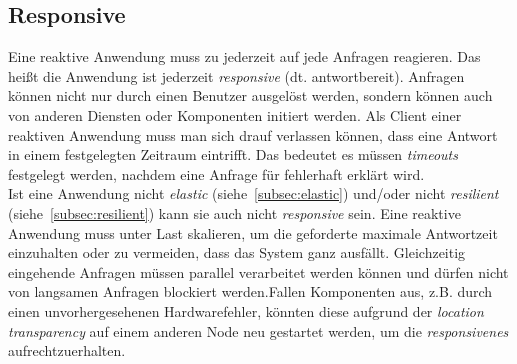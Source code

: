 \subsection{Responsive}\label{subsec:responsive}
Eine reaktive Anwendung muss zu jederzeit auf jede Anfragen reagieren. Das heißt die Anwendung ist jederzeit \textit{responsive} (dt. antwortbereit). Anfragen können nicht nur durch einen Benutzer ausgelöst werden, sondern können auch von anderen Diensten oder Komponenten initiert werden. Als Client einer reaktiven Anwendung muss man sich drauf verlassen können, dass eine Antwort in einem festgelegten Zeitraum eintrifft. Das bedeutet es müssen \textit{timeouts} festgelegt werden, nachdem eine Anfrage für fehlerhaft erklärt wird.\\
Ist eine Anwendung nicht \textit{elastic} (siehe~\ref{subsec:elastic}) und/oder nicht \textit{resilient} (siehe~\ref{subsec:resilient}) kann sie auch nicht \textit{responsive} sein. Eine reaktive Anwendung muss unter Last skalieren, um die geforderte maximale Antwortzeit einzuhalten oder zu vermeiden, dass das System ganz ausfällt. Gleichzeitig eingehende Anfragen müssen parallel verarbeitet werden können und dürfen nicht von langsamen Anfragen blockiert werden.Fallen Komponenten aus, z.B. durch einen unvorhergesehenen Hardwarefehler, könnten diese aufgrund der \textit{location transparency} auf einem anderen Node neu gestartet werden, um die \textit{responsivenes} aufrechtzuerhalten.

\pagebreak

